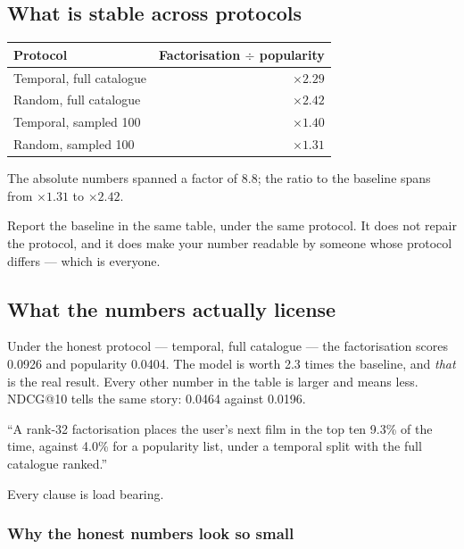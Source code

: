 \documentclass[11pt,a4paper]{article}
\begin{document}
\subsection{What is stable across protocols}

\begin{center}
\small
\begin{tabular}{lr}
\toprule
\textbf{Protocol} & \textbf{Factorisation $\div$ popularity} \\
\midrule
Temporal, full catalogue & $\times 2.29$ \\
Random, full catalogue   & $\times 2.42$ \\
Temporal, sampled 100    & $\times 1.40$ \\
Random, sampled 100      & $\times 1.31$ \\
\bottomrule
\end{tabular}
\end{center}

The absolute numbers spanned a factor of 8.8; the ratio to the baseline spans
from $\times 1.31$ to $\times 2.42$.

\begin{keybox}[title={The practical rule}]
Report the baseline in the same table, under the same protocol. It does not
repair the protocol, and it does make your number readable by someone whose
protocol differs --- which is everyone.
\end{keybox}

\subsection{What the numbers actually license}

Under the honest protocol --- temporal, full catalogue --- the factorisation
scores 0.0926 and popularity 0.0404. The model is worth 2.3 times the baseline,
and \emph{that} is the real result. Every other number in the table is larger
and means less. NDCG@10 tells the same story: 0.0464 against 0.0196.

\begin{keybox}[title={The honest headline}]
``A rank-32 factorisation places the user's next film in the top ten 9.3\% of
the time, against 4.0\% for a popularity list, under a temporal split with the
full catalogue ranked.''

Every clause is load bearing.
\end{keybox}

\subsubsection{Why the honest numbers look so small}
\end{document}
